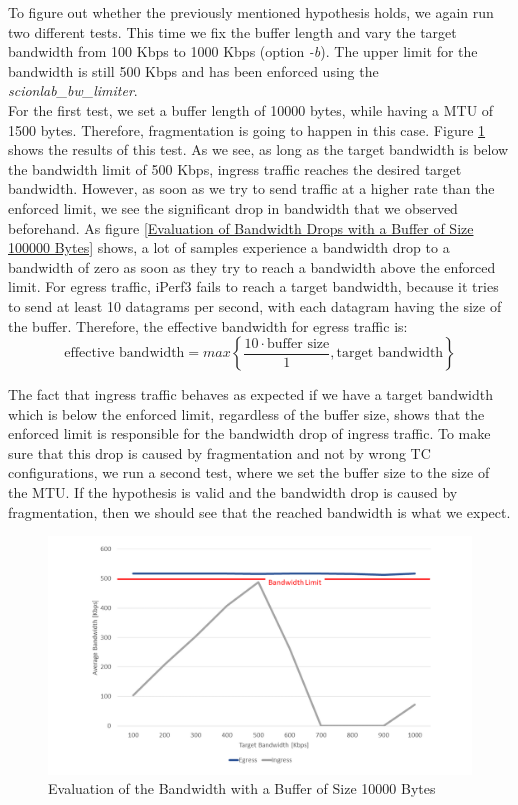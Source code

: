 To figure out whether the previously mentioned hypothesis holds, we again run two different tests. This time we fix the buffer length and vary the target bandwidth from 100 Kbps to 1000 Kbps (option \textit{-b}). The upper limit for the bandwidth is still 500 Kbps and has been enforced using the \textit{scionlab\_bw\_limiter}. 
\\
For the first test, we set a buffer length of 10000 bytes, while having a \acs{MTU} of 1500 bytes. Therefore, fragmentation is going to happen in this case. Figure \ref{Evaluation of the Bandwidth with a Buffer of Size 10000 Bytes} shows the results of this test. As we see, as long as the target bandwidth is below the bandwidth limit of 500 Kbps, ingress traffic reaches the desired target bandwidth. However, as soon as we try to send traffic at a higher rate than the enforced limit, we see the significant drop in bandwidth that we observed beforehand. As figure \ref{Evaluation of Bandwidth Drops with a Buffer of Size 100000 Bytes} shows, a lot of samples experience a bandwidth drop to a bandwidth of zero as soon as they try to reach a bandwidth above the enforced limit. For egress traffic, iPerf3 fails to reach a target bandwidth, because it tries to send at least 10 datagrams per second, with each datagram having the size of the buffer. Therefore, the effective bandwidth for egress traffic is: 
$$\text{effective bandwidth} = max\left\lbrace\frac{10\cdot \text{buffer size}}{1},\text{target bandwidth}\right\rbrace$$ 

The fact that ingress traffic behaves as expected if we have a target bandwidth which is below the enforced limit, regardless of the buffer size, shows that the enforced limit is responsible for the bandwidth drop of ingress traffic. To make sure that this drop is caused by fragmentation and not by wrong \acs{TC} configurations, we run a second test, where we set the buffer size to the size of the \acs{MTU}. If the hypothesis is valid and the bandwidth drop is caused by fragmentation, then we should see that the reached bandwidth is what we expect.

\begin{figure}[h]
	\centering
	\includegraphics[width=\textwidth]{img/Evaluation-Bandwidth-Big-Buffer.png}
	\caption{Evaluation of the Bandwidth with a Buffer of Size 10000 Bytes}
	\label{Evaluation of the Bandwidth with a Buffer of Size 10000 Bytes}
\end{figure}

